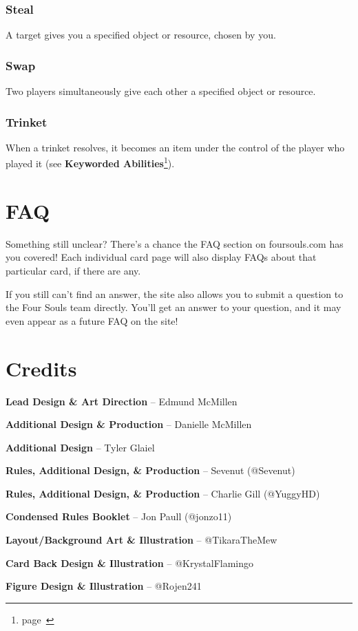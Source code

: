 \documentclass[
  fontsize=10pt,
  paper=a5,
  version=last,
  chapterprefix=true,
  bindingoffset=5mm,
  ]{scrbook}
\begin{document}
    \subsection*{Steal}
    A target gives you a specified object or resource, chosen by you.
    \subsection*{Swap}
    Two players simultaneously give each other a specified object or resource.
    \subsection*{Trinket}
    When a trinket resolves, it becomes an item under the control of the player who played it (see \textbf{Keyworded Abilities}\footnote{page~\pageref{keyworded}}).

    \chapter{FAQ}
    Something still unclear? There’s a chance the FAQ section on foursouls.com has you covered! Each individual card page will also display FAQs about that particular card, if there are any.

    If you still can’t find an answer, the site also allows you to submit a question to the Four Souls team directly. You’ll get an answer to your question, and it may even appear as a future FAQ on the site!

    \chapter{Credits}
    \textbf{Lead Design \& Art Direction} – Edmund McMillen

    \textbf{Additional Design \& Production} – Danielle McMillen

    \textbf{Additional Design} – Tyler Glaiel

    \textbf{Rules, Additional Design, \& Production} – Sevenut (@Sevenut)

    \textbf{Rules, Additional Design, \& Production} – Charlie Gill (@YuggyHD)

    \textbf{Condensed Rules Booklet} – Jon Paull (@jonzo11)

    \textbf{Layout/Background Art \& Illustration} – @TikaraTheMew

    \textbf{Card Back Design \& Illustration} – @KrystalFlamingo

    \textbf{Figure Design \& Illustration} – @Rojen241
\end{document}
